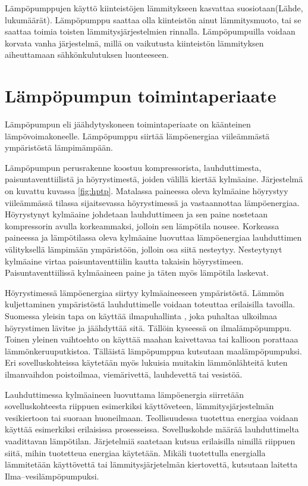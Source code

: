 Lämpöpumppujen käyttö kiinteistöjen lämmitykseen kasvattaa suosiotaan(Lähde, lukumäärät). Lämpöpumppu saattaa olla kiinteistön ainut lämmitysmuoto, tai se saattaa toimia toisten lämmitysjärjestelmien rinnalla. Lämpöpumpuilla voidaan korvata vanha järjestelmä, millä on vaikutusta kiinteistön lämmityksen aiheuttamaan sähkönkulutuksen luonteeseen.

\section{Lämpöpumpun toimintaperiaate}
  Lämpöpumpun eli jäähdytyskoneen toimintaperiaate on käänteinen lämpövoimakoneelle. Lämpöpumppu siirtää lämpöenergiaa viileämmästä ympäristöstä lämpimämpään.

  Lämpöpumpun perusrakenne koostuu kompressorista, lauhduttimesta, paisuntaventtiilistä ja höyrystimestä, joiden välillä kiertää kylmäaine. Järjestelmä on kuvattu kuvassa \ref{fig:hptp}. Matalassa paineessa oleva kylmäaine höyrystyy viileämmässä tilassa sijaitsevassa höyrystimessä ja vastaannottaa lämpöenergiaa. Höyrystynyt kylmäaine johdetaan lauhduttimeen ja sen paine nostetaan kompressorin avulla korkeammaksi, jolloin sen lämpötila nousee. Korkeassa paineessa ja lämpötilassa oleva kylmäaine luovuttaa lämpöenergiaa lauhduttimen välityksellä lämpimään ympäristöön, jolloin osa siitä nesteytyy. Nesteytynyt kylmäaine virtaa paisuntaventtiilin kautta takaisin höyrystimeen. Paisuntaventtiilissä kylmäaineen paine ja täten myös lämpötila laskevat.

  Höyrystimessä lämpöenergiaa siirtyy kylmäaineeseen ympäristöstä. Lämmön kuljettaminen ympäristöstä lauhduttimelle voidaan toteuttaa erilaisilla tavoilla. Suomessa yleisin tapa on käyttää ilmapuhallinta \parencite{lähde}, joka puhaltaa ulkoilmaa höyrystimen lävitse ja jäähdyttää sitä. Tällöin kyseessä on ilmalämpöpumppu. Toinen yleinen vaihtoehto on käyttää maahan kaivettavaa tai kallioon porattaaa lämmönkeruuputkistoa. Tälläistä lämpöpumppua kutsutaan maalämpöpumpuksi. Eri sovelluskohteissa käytetään myös lukuisia muitakin lämmönlähteitä kuten ilmanvaihdon poistoilmaa, viemärivettä, lauhdevettä tai vesistöä\parencite{lähde}.

  Lauhduttimessa kylmäaineen luovuttama lämpöenergia siirretään sovelluskohteesta riippuen esimerkiksi käyttöveteen, lämmitysjärjestelmän vesikiertoon tai suoraan huoneilmaan. Teollisuudessa tuotettua energiaa voidaan käyttää esimerkiksi erilaisissa prosesseissa. Sovelluskohde määrää lauhduttimelta vaadittavan lämpötilan. Järjetelmiä saatetaan kutsua erilaisilla nimillä riippuen siitä, mihin tuotetteua energiaa käytetään. Mikäli tuotettulla energialla lämmitetään käyttövettä tai lämmitysjärjetelmän kiertovettä, kutsutaan laitetta Ilma--vesilämpöpumpuksi\parencite{lähde}.

